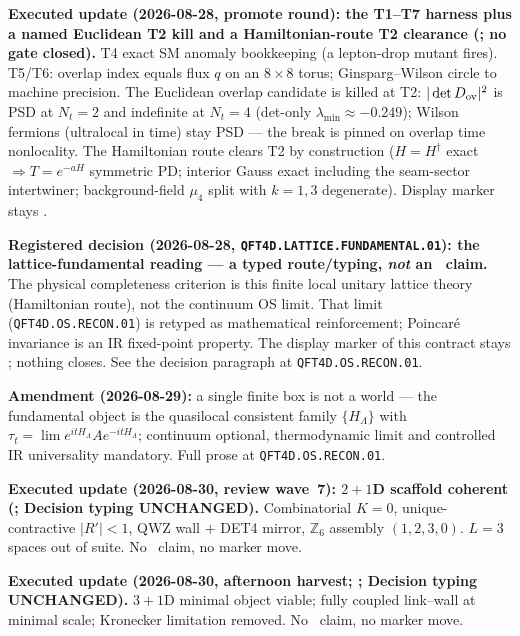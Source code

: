 \documentclass[11pt,a4paper]{article}
\begin{document}
\par\smallskip\noindent\textbf{Executed update (2026-08-28, promote round): the T1--T7 harness
plus a named Euclidean T2 kill and a Hamiltonian-route T2 clearance
(; no gate closed).}
T4 exact SM anomaly bookkeeping (a lepton-drop mutant fires).  T5/T6: overlap index equals flux
$q$ on an $8\times8$ torus; Ginsparg--Wilson circle to machine precision.  The Euclidean overlap
candidate is killed at T2: $|\det D_{\rm ov}|^2$ is PSD at $N_t=2$ and indefinite at $N_t=4$
(det-only $\lambda_{\min}\approx-0.249$); Wilson fermions (ultralocal in time) stay PSD --- the
break is pinned on overlap time nonlocality.  The Hamiltonian route clears T2 by construction
($H=H^\dagger$ exact $\Rightarrow T=e^{-aH}$ symmetric PD; interior Gauss exact including the
seam-sector intertwiner; background-field $\mu_4$ split with $k=1,3$ degenerate).  Display
marker stays \mO.

\par\smallskip\noindent\textbf{Registered decision (2026-08-28,
\texttt{QFT4D.LATTICE.FUNDAMENTAL.01}): the lattice-fundamental reading --- a typed
route/typing, \emph{not} an \mE\ claim.}
The physical completeness criterion is this finite local unitary lattice theory (Hamiltonian
route), not the continuum OS limit.  That limit (\texttt{QFT4D.OS.RECON.01}) is retyped as
mathematical reinforcement; Poincar\'e invariance is an IR fixed-point property.  The display
marker of this contract stays \mO; nothing closes.  See the decision paragraph at
\texttt{QFT4D.OS.RECON.01}.

\par\smallskip\noindent\textbf{Amendment (2026-08-29):} a single finite box is not a world ---
the fundamental object is the quasilocal consistent family $\{H_\Lambda\}$ with
$\tau_t=\lim e^{itH_\Lambda}A e^{-itH_\Lambda}$; continuum optional, thermodynamic limit and
controlled IR universality mandatory.  Full prose at \texttt{QFT4D.OS.RECON.01}.

\par\smallskip\noindent\textbf{Executed update (2026-08-30, review wave~7): $2{+}1$D scaffold
coherent (;
Decision typing UNCHANGED).}
Combinatorial $K=0$, unique-contractive $\lvert R'\rvert<1$, QWZ wall $+$ DET4 mirror,
$\mathbb Z_6$ assembly $(1,2,3,0)$.  $L=3$ spaces out of suite.  No \mE\ claim, no marker move.

\par\smallskip\noindent\textbf{Executed update (2026-08-30, afternoon harvest;
;
Decision typing UNCHANGED).}
$3{+}1$D minimal object viable; fully coupled link--wall at minimal scale; Kronecker
limitation removed.  No \mE\ claim, no marker move.
\end{document}
